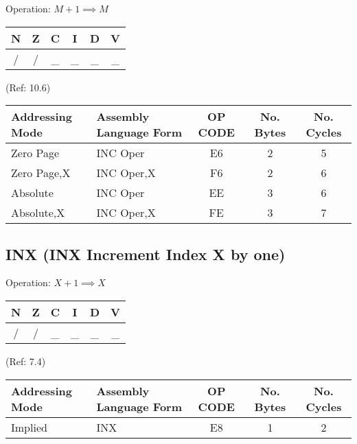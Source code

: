 \documentclass{article}
\begin{document}
  Operation:  $M + 1 \implies M$
  \begin{table}[H]
  \centering
  \begin{tabular}{|c c c c c c|}
  \hline
  N&Z&C&I&D&V\\
  \hline
  / & / & \_ & \_ & \_ & \_\\
  \hline
  \end{tabular}
  \end{table}
                                 (Ref: 10.6)
  \begin{table}[H]
  \centering
  \begin{tabular}{|l|l|c|c|c|}
  \hline
   Addressing Mode& Assembly Language Form& OP CODE &No. Bytes&No. Cycles\\
  \hline
    Zero Page     &   INC Oper            &    E6   &    2    &    5     \\
    Zero Page,X   &   INC Oper,X          &    F6   &    2    &    6     \\
    Absolute      &   INC Oper            &    EE   &    3    &    6     \\
    Absolute,X    &   INC Oper,X          &    FE   &    3    &    7     \\
  \hline
  \end{tabular}
  \end{table}

  \subsection{INX (INX Increment Index X by one)}

  Operation:  $X + 1 \implies X$
  \begin{table}[H]
  \centering
  \begin{tabular}{|c c c c c c|}
  \hline
  N&Z&C&I&D&V\\
  \hline
  / & / & \_ & \_ & \_ & \_\\
  \hline
  \end{tabular}
  \end{table}
                                 (Ref: 7.4)
  \begin{table}[H]
  \centering
  \begin{tabular}{|l|l|c|c|c|}
  \hline
   Addressing Mode& Assembly Language Form& OP CODE &No. Bytes&No. Cycles\\
  \hline
    Implied       &   INX                 &    E8   &    1    &    2     \\
  \hline
  \end{tabular}
  \end{table}
\end{document}
